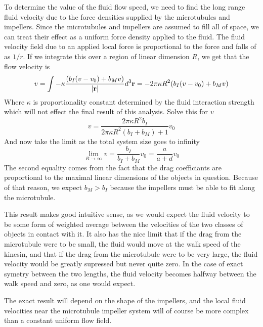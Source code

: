\documentclass[11pt]{ucthesis}
\def\br{{\bf r}}
\begin{document}
To determine the value of the fluid flow speed, we need to find the long range fluid velocity due to the force densities supplied by the microtubules and impellers.
Since the microtubules and impellers are assumed to fill all of space, we can treat their effect as a uniform force density applied to the fluid.
The fluid velocity field due to an applied local force is proportional to the force and falls of as $1/r$. If we integrate this over a region of linear dimension $R$, we get that the flow velocity is
\begin{equation}
\label{eq:mfflow}
v = \int -\kappa \frac{(b_I (v - v_0) + b_M v)}{|\br|} d^3\br = -2\pi \kappa R^2 (b_I (v - v_0) + b_M v)
\end{equation}
Where $\kappa$ is proportionality constant determined by the fluid interaction strength which will not effect the final result of this analysis.
Solve this for $v$
\begin{equation}
\label{eq:mfflowsol}
v = \frac{2\pi \kappa R^2 b_I}{2\pi \kappa R^2(b_I + b_M) + 1} v_0
\end{equation}
And now take the limit as the total system size goes to infinity
\begin{equation}
\label{eq:mfflowlimit}
\lim_{R\to\infty} v = \frac{b_I}{b_I + b_M} v_0 = \frac{a}{a+d} v_0
\end{equation}
The second equality comes from the fact that the drag coefficiants are proportional to the maximal linear dimensions of the objects in question. Because of that reason, we expect $b_M > b_I$ because the impellers must be able to fit along the microtubule.

This result makes good intuitive sense, as we would expect the fluid velocity to be some form of weighted average between the velocities of the two classes of objects in contact with it. 
It also has the nice limit that if the drag from the microtubule were to be small, the fluid would move at the walk speed of the kinesin, and that if the drag from the microtubule were to be very large, the fluid velocity would be greatly supressed but never quite zero.
In the case of exact symetry between the two lengths, the fluid velocity becomes halfway between the walk speed and zero, as one would expect.

The exact result will depend on the shape of the impellers, and the local fluid velocities near the microtubule impeller system will of course be more complex than a constant uniform flow field.
\end{document}
